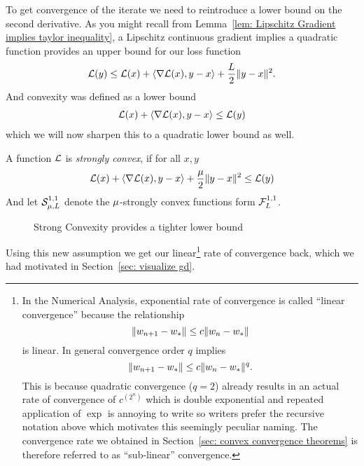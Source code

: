 To get convergence of the iterate we need to reintroduce a lower bound on
the second derivative. As you might recall from Lemma~\ref{lem: Lipschitz
Gradient implies taylor inequality}, a Lipschitz continuous gradient implies
a quadratic function provides an upper bound for our loss function
%
\begin{align}\label{eq: upper bound}
	\mathcal{L}(y) \le \mathcal{L}(x) + \langle \nabla \mathcal{L}(x), y-x\rangle + \frac{L}{2}\|y-x\|^2.
\end{align}
%
And convexity was defined as a lower bound
%
\begin{align*}
	\mathcal{L}(x) + \langle \nabla \mathcal{L}(x), y-x\rangle \le \mathcal{L}(y)
\end{align*}
%
which we will now sharpen this to a quadratic lower bound as well.
%
\begin{definition}\label{def: strong convexity}
	A function \(\mathcal{L}\) is \emph{strongly convex}, if for all \(x,y\)
	\begin{align*}
		\mathcal{L}(x) + \langle \nabla \mathcal{L}(x), y-x\rangle + \frac{\mu}{2}\|y-x\|^2 \le \mathcal{L}(y)
	\end{align*}
	And let \(\mathcal{S}^{1,1}_{{\mu},{L}}\) denote the \(\mu\)-strongly convex
	functions form \(\mathcal{F}^{1,1}_{L}\).
\end{definition}
%
\begin{figure}[h]
	\centering
	\def\svgwidth{1\textwidth}
	
	\caption{Strong Convexity provides a tighter lower bound}
	\label{fig: visualize strong convexity}
\end{figure}
%
Using this new assumption we get our linear\footnote{
	In the Numerical Analysis, exponential rate of
	convergence is called ``linear convergence'' because the relationship
	\[
		\|w_{n+1} - w_*\| \le c \|w_n - w_*\|
	\]
	is linear. In
	general convergence order \(q\) implies 
	\[
		\|w_{n+1} -w_*\| \le c\|w_n - w_*\|^q.
	\]
	This is because quadratic convergence (\(q=2\)) already results in an actual
	rate of convergence of \(c^{\left(2^n\right)}\) which is double exponential and
	repeated application of \(\exp\) is annoying to write so writers prefer the
	recursive notation above which motivates this seemingly peculiar naming.
	The convergence rate we obtained in Section~\ref{sec: convex convergence theorems}
	is therefore referred to as ``sub-linear'' convergence.
}
rate of convergence back, which we had motivated in Section~\ref{sec: visualize gd}. 
%
